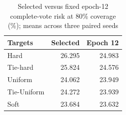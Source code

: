 \begin{table}[t]
\caption{Selected versus fixed epoch-12 complete-vote risk at 80\% coverage (\%); means across three paired seeds}\label{tab:sensitivity}
\centering\begin{tabular}{lrr}\toprule
Targets & Selected & Epoch 12\\\midrule
Hard & 26.295 & 24.983\\
Tie-hard & 25.824 & 24.576\\
Uniform & 24.062 & 23.949\\
Tie-Uniform & 24.272 & 23.939\\
Soft & 23.684 & 23.632\\
\bottomrule\end{tabular}\par

\end{table}
